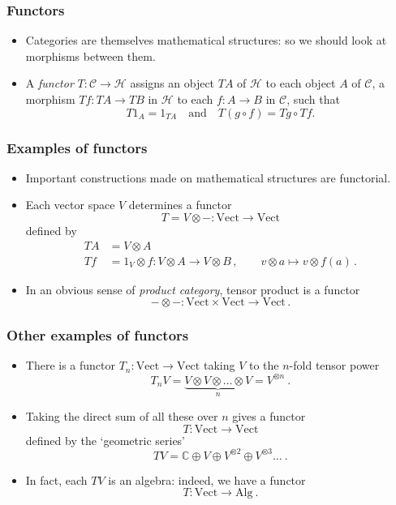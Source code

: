 \documentclass{beamer}
\newcommand{\lra}{\longrightarrow}
\def\CC{{\mathscr C}}
\def\CH{{\mathscr H}}
\begin{document}
\begin{frame}
  \frametitle{Functors}

\begin{itemize}
\item Categories are themselves mathematical structures: so we should look at morphisms between them.
\pause
\bigskip
\item A \emph{functor} $T : \CC  \lra \CH$ assigns an object $TA$ of $\CH$ to each object $A$ of $\CC$, 
a morphism $Tf : TA  \lra TB$ in $\CH$ to each $f : A  \lra B$ in $\CC$, such that
\[
T1_A = 1_{TA} \quad \mbox{and} \quad T(g \circ f) = Tg \circ Tf.
\]
\end{itemize}
\end{frame}

\begin{frame}
  \frametitle{Examples of functors}
\begin{itemize}
\item 
Important constructions made on mathematical structures are functorial. 
\pause
\item Each vector space $V$ determines a functor
\[
T = V\otimes - : \mathrm{Vect}  \lra \mathrm{Vect} 
\]
defined by
\begin{align*}
TA &= V \otimes A  \\
Tf &= 1_V \otimes f : V \otimes A \lra V \otimes B\,,   \qquad  v \otimes a \longmapsto v \otimes f(a)\,. 
\end{align*}
\pause
\item In an obvious sense of \emph{product category}, tensor product is a functor
\[
- \otimes - : \mathrm{Vect}  \times \mathrm{Vect}  \lra \mathrm{Vect}\,.
\]
\end{itemize}
\end{frame}

\begin{frame}
  \frametitle{Other examples of functors}
\begin{itemize}
\item 
There is a functor $T_n : \mathrm{Vect}  \lra \mathrm{Vect} $
taking $V$ to the $n$-fold tensor power 
$$T_nV =  \underbrace{V\otimes V \otimes \dots \otimes V}_n = V^{\otimes n}\ .$$
\pause
\item Taking the direct sum of all these over $n$ gives
a functor
\[
T  : \mathrm{Vect}  \lra \mathrm{Vect} 
\]
defined by the `geometric series'
$$TV = \mathbb{C}\oplus V\oplus V^{\otimes 2}\oplus V^{\otimes 3}\dots \ .$$
\pause
\item In fact, each $TV$ is an algebra: indeed, we have a functor 
\[
T  : \mathrm{Vect}  \lra \mathrm{Alg} \ .
\]
\end{itemize}
\end{frame}
\end{document}
